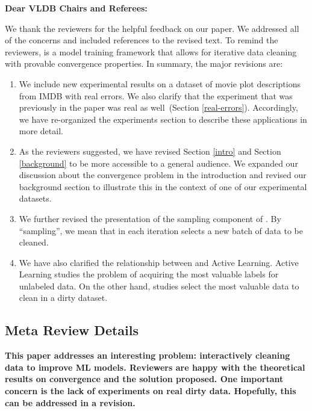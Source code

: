 {\noindent \normalsize \bf Dear VLDB Chairs and Referees: }

\vspace{.5em}

We thank the reviewers for the helpful feedback on our paper. 
We addressed all of the concerns and included references to the revised text. 
To remind the reviewers, \sys is a model training framework that allows for iterative data cleaning with provable convergence properties.
In summary, the major revisions are:

\begin{enumerate}
\item We include new experimental results on a dataset of movie plot descriptions from IMDB with real errors. We also clarify that the experiment that was previously in the paper was real as well~(Section \ref{real-errors}). Accordingly, we have re-organized the experiments section to describe these applications in more detail.

\item As the reviewers suggested, we have revised Section \ref{intro} and Section \ref{background} to be more accessible to a general audience. We expanded our discussion about the convergence problem in the introduction and revised our background section to illustrate this in the context of one of our experimental datasets.

\item We further revised the presentation of the sampling component of \sys. By ``sampling'', we mean that in each iteration \sys selects a new batch of data to be cleaned. 

\item We have also clarified the relationship between \sys and Active Learning. Active Learning studies the problem of acquiring the most valuable labels for unlabeled data. On the other hand, \sys studies select the most valuable data to clean in a dirty dataset. 

\end{enumerate}

\subsection*{Meta Review Details} 

\noindent\noindent \textbf{This paper addresses an interesting problem: interactively cleaning data to improve ML models. Reviewers are happy with the theoretical results on convergence and the solution proposed. One important concern is the lack of experiments on real dirty data. Hopefully, this can be addressed in a revision.}

